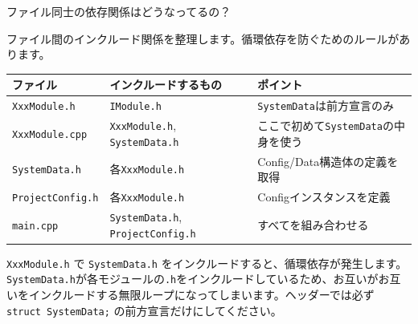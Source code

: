 \begin{qabox}{ファイル同士の依存関係はどうなってるの？}

ファイル間のインクルード関係を整理します。循環依存を防ぐためのルールがあります。

\vspace{2mm}
\begin{tabularx}{\textwidth}{l l X}
\toprule
\textbf{ファイル} & \textbf{インクルードするもの} & \textbf{ポイント} \\
\midrule
\texttt{XxxModule.h} & \texttt{IModule.h} & \texttt{SystemData}は前方宣言のみ \\
\texttt{XxxModule.cpp} & \texttt{XxxModule.h}, \texttt{SystemData.h} & ここで初めて\texttt{SystemData}の中身を使う \\
\texttt{SystemData.h} & 各\texttt{XxxModule.h} & Config/Data構造体の定義を取得 \\
\texttt{ProjectConfig.h} & 各\texttt{XxxModule.h} & Configインスタンスを定義 \\
\texttt{main.cpp} & \texttt{SystemData.h}, \texttt{ProjectConfig.h} & すべてを組み合わせる \\
\bottomrule
\end{tabularx}

\begin{cautionbox}
\texttt{XxxModule.h} で \texttt{SystemData.h} をインクルードすると、循環依存が発生します。\texttt{SystemData.h}が各モジュールの\texttt{.h}をインクルードしているため、お互いがお互いをインクルードする無限ループになってしまいます。ヘッダーでは必ず \texttt{struct SystemData;} の前方宣言だけにしてください。
\end{cautionbox}

\end{qabox}
